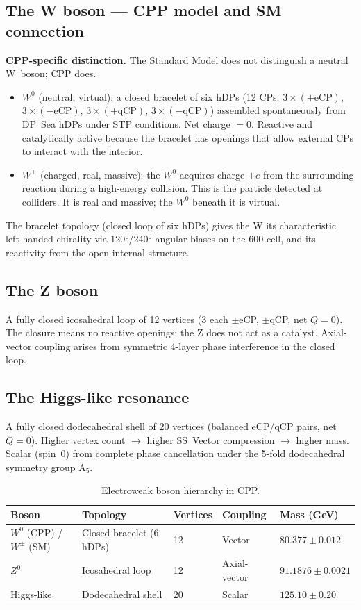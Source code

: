 \documentclass[11pt,a4paper]{article}
\begin{document}
\subsection{The W boson --- CPP model and SM connection}

\textbf{CPP-specific distinction.}  The Standard Model does not
distinguish a neutral W~boson; CPP does.

\begin{itemize}
\item $W^0$ (neutral, virtual): a closed bracelet of six hDPs (12 CPs:
  $3{\times}(+\text{eCP})$, $3{\times}(-\text{eCP})$,
  $3{\times}(+\text{qCP})$, $3{\times}(-\text{qCP})$) assembled
  spontaneously from DP~Sea hDPs under STP conditions.  Net charge
  $= 0$.  Reactive and catalytically active because the bracelet has
  openings that allow external CPs to interact with the interior.
\item $W^\pm$ (charged, real, massive): the $W^0$ acquires charge
  $\pm e$ from the surrounding reaction during a high-energy
  collision.  This is the particle detected at colliders.  It is
  real and massive; the $W^0$ beneath it is virtual.
\end{itemize}

The bracelet topology (closed loop of six hDPs) gives the W its
characteristic left-handed chirality via 120°/240° angular biases on
the 600-cell, and its reactivity from the open internal structure.

\subsection{The Z boson}

A fully closed icosahedral loop of 12 vertices (3 each $\pm$eCP,
$\pm$qCP, net $Q=0$).  The closure means no reactive openings: the Z
does not act as a catalyst.  Axial-vector coupling arises from
symmetric 4-layer phase interference in the closed loop.

\subsection{The Higgs-like resonance}

A fully closed dodecahedral shell of 20 vertices (balanced eCP/qCP
pairs, net $Q=0$).  Higher vertex count $\to$ higher SS~Vector
compression $\to$ higher mass.  Scalar (spin~0) from complete phase
cancellation under the 5-fold dodecahedral symmetry group A$_5$.

\begin{table}[H]
\centering
\caption{Electroweak boson hierarchy in CPP.}
\label{tab:hierarchy}
\begin{tabular}{@{}lllll@{}}
\toprule
Boson & Topology & Vertices & Coupling & Mass (GeV) \\
\midrule
$W^0$ (CPP) / $W^\pm$ (SM) & Closed bracelet (6 hDPs) & 12 & Vector & $80.377\pm0.012$ \\
$Z^0$ & Icosahedral loop & 12 & Axial-vector & $91.1876\pm0.0021$ \\
Higgs-like & Dodecahedral shell & 20 & Scalar & $125.10\pm0.20$ \\
\bottomrule
\end{tabular}
\end{table}
\end{document}
